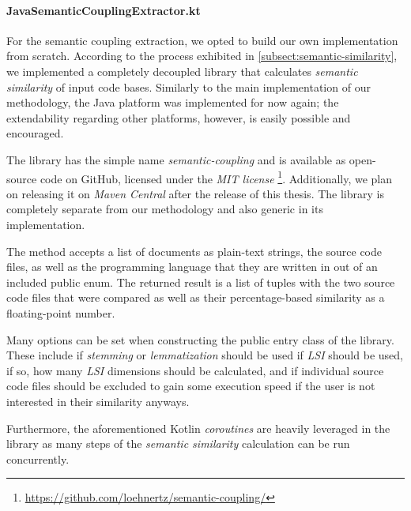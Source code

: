 \documentclass[12pt,a4paper]{report}
\begin{document}
\paragraph{JavaSemanticCouplingExtractor.kt}
For the semantic coupling
extraction, we opted to build our own implementation from scratch. According to
the process exhibited in \ref{subsect:semantic-similarity}, we implemented a
completely decoupled library that calculates \textit{semantic similarity} of
input code bases. Similarly to the main implementation of our methodology, the
Java platform was implemented for now again; the extendability regarding other
platforms, however, is easily possible and encouraged.

The library has the simple name \textit{semantic-coupling} and is available as
open-source code on GitHub, licensed under the \textit{MIT license} \footnote{
\url{https://github.com/loehnertz/semantic-coupling/}}. Additionally, we plan
on releasing it on \textit{Maven Central} after the release of this thesis.
The library is completely separate from our methodology and also generic in its
implementation.

The  method accepts a list of documents as plain-text strings, the
source code files, as well as the programming language that they are written in
out of an included public enum. The returned result is a list of tuples with
the two source code files that were compared as well as their percentage-based
similarity as a floating-point number.

Many options can be set when constructing the public entry class
of the library. These include if \textit{stemming} or \textit{lemmatization}
should be used if \textit{LSI} should be used, if so, how many \textit{LSI}
dimensions should be calculated, and if individual source code files should be
excluded to gain some execution speed if the user is not interested in their
similarity anyways.

Furthermore, the aforementioned Kotlin \textit{coroutines} are heavily
leveraged in the library as many steps of the \textit{semantic similarity}
calculation can be run concurrently.
\end{document}
